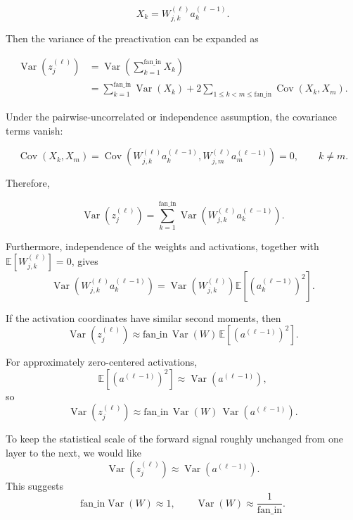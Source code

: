 \documentclass{article}
\begin{document}
\[
  X_k
  =
  W_{j,k}^{(\ell)}a_k^{(\ell-1)}.
\]

Then the variance of the preactivation can be expanded as

\[
  \begin{aligned}
  \operatorname{Var}\!\left(z_j^{(\ell)}\right)
  &=
  \operatorname{Var}\!\left(
    \sum_{k=1}^{\text{fan\_in}}
    X_k
  \right) \\[4pt]
  &=
  \sum_{k=1}^{\text{fan\_in}}
  \operatorname{Var}(X_k)
  +
  2
  \sum_{1 \leq k < m \leq \text{fan\_in}}
  \operatorname{Cov}(X_k,X_m).
  \end{aligned}
\]

Under the pairwise-uncorrelated or independence assumption, the
covariance terms vanish:

\[
  \operatorname{Cov}(X_k,X_m)
  =
  \operatorname{Cov}\!\left(
    W_{j,k}^{(\ell)}a_k^{(\ell-1)},
    W_{j,m}^{(\ell)}a_m^{(\ell-1)}
  \right)
  =
  0,
  \qquad
  k \neq m.
\]

Therefore,

\[
  \operatorname{Var}\!\left(z_j^{(\ell)}\right)
  =
  \sum_{k=1}^{\text{fan\_in}}
  \operatorname{Var}\!\left(
    W_{j,k}^{(\ell)}a_k^{(\ell-1)}
  \right).
\]

Furthermore, independence of the weights and activations, together with
\(\mathbb{E}[W_{j,k}^{(\ell)}]=0\), gives
\[
  \operatorname{Var}\!\left(
    W_{j,k}^{(\ell)}a_k^{(\ell-1)}
  \right)
  =
  \operatorname{Var}\!\left(W_{j,k}^{(\ell)}\right)
  \mathbb{E}\!\left[
    \left(a_k^{(\ell-1)}\right)^2
  \right].
\]

If the activation coordinates have similar second moments, then
\[
  \operatorname{Var}\!\left(z_j^{(\ell)}\right)
  \approx
  \text{fan\_in}\,
  \operatorname{Var}(W)\,
  \mathbb{E}\!\left[
    \left(a^{(\ell-1)}\right)^2
  \right].
\]

For approximately zero-centered activations,
\[
  \mathbb{E}\!\left[
    \left(a^{(\ell-1)}\right)^2
  \right]
  \approx
  \operatorname{Var}\!\left(a^{(\ell-1)}\right),
\]
so
\[
  \operatorname{Var}\!\left(z_j^{(\ell)}\right)
  \approx
  \text{fan\_in}\,
  \operatorname{Var}(W)\,
  \operatorname{Var}\!\left(a^{(\ell-1)}\right).
\]

To keep the statistical scale of the forward signal roughly unchanged
from one layer to the next, we would like
\[
  \operatorname{Var}\!\left(z_j^{(\ell)}\right)
  \approx
  \operatorname{Var}\!\left(a^{(\ell-1)}\right).
\]
This suggests
\[
  \text{fan\_in}\operatorname{Var}(W) \approx 1,
  \qquad
  \operatorname{Var}(W)
  \approx
  \frac{1}{\text{fan\_in}}.
\]
\end{document}
